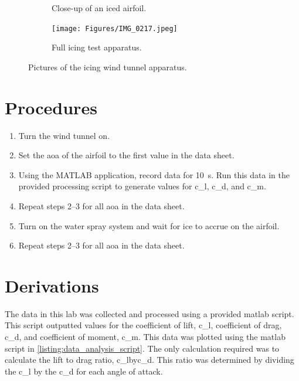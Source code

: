 \begin{figure}[htpb]
\begin{subfigure}{0.49\textwidth}
        \caption{Close-up of an iced airfoil.}
        \label{fig:iced_airfoil}
    \end{subfigure}
    \begin{subfigure}{0.49\textwidth}
        \centering
        \texttt{[image: Figures/IMG\_0217.jpeg]}
        \caption{Full icing test apparatus.}
        \label{fig:full_test_apparatus}
    \end{subfigure}
    \caption{Pictures of the icing wind tunnel apparatus.}
    \label{fig:apparatus}
    \vspace*{1.5in}
\end{figure}

\section{Procedures} \label{sec:procedures}

\begin{enumerate}
    \item Turn the wind tunnel on.
    \item Set the \acrshort{aoa} of the airfoil to the first value in the data sheet.
    \item Using the MATLAB application, record data for \qty{10}{\second}. Run this data in the provided processing script to generate values for \gls{c_l}, \gls{c_d}, and \gls{c_m}.
    \item Repeat steps \numrange{2}{3} for all \acrshort{aoa} in the data sheet.
    \item Turn on the water spray system and wait for ice to accrue on the airfoil.
    \item Repeat steps \numrange{2}{3} for all \acrshort{aoa} in the data sheet.
\end{enumerate}

\section{Derivations} \label{sec:derivations}

The data in this lab was collected and processed using a provided \acrfull{matlab} script. This script outputted values for the coefficient of lift, \gls{c_l}, coefficient of drag, \gls{c_d}, and coefficient of moment, \gls{c_m}. This data was plotted using the \acrshort{matlab} script in \autoref{listing:data_analysis_script}. The only calculation required was to calculate the lift to drag ratio, \gls{c_lbyc_d}. This ratio was determined by dividing the \gls{c_l} by the \gls{c_d} for each angle of attack.